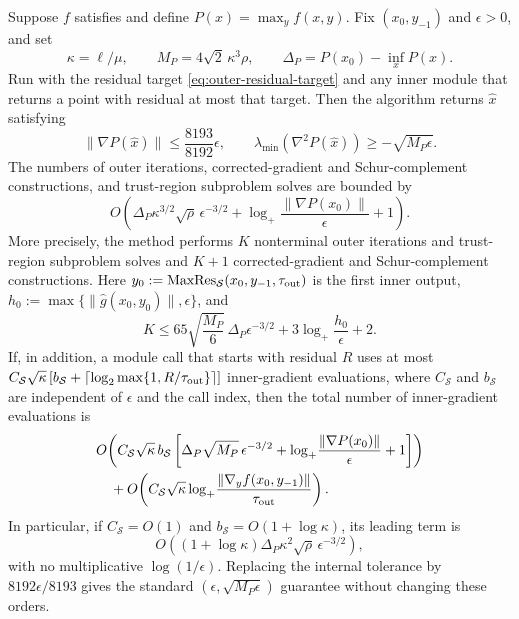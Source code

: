 \documentclass{article}
\begin{document}
\begin{theorem}
\label{thm:ncsc-complexity}
Suppose $f$ satisfies  and define
$P(x)=\max_y f(x,y)$.  Fix
$(x_0,y_{-1})$ and $\epsilon>0$, and set
\[
 \kappa=\ell/\mu,
 \qquad M_P=4\sqrt2\,\kappa^3\rho,
 \qquad \Delta_P=P(x_0)-\inf_xP(x).
\]
Run  with the residual target
\eqref{eq:outer-residual-target} and any inner module that returns a
point with residual at most that target.  Then the algorithm returns
$\widehat x$ satisfying
\begin{equation}\label{eq:ncsc-return}
 \|\nabla P(\widehat x)\|\le\frac{8193}{8192}\epsilon,
 \qquad
 \lambda_{\min}(\nabla^2P(\widehat x))
 \ge-\sqrt{M_P\epsilon}.
\end{equation}
The numbers of outer iterations, corrected-gradient and
Schur-complement constructions, and trust-region subproblem solves are
bounded by
\begin{equation}\label{eq:ncsc-outer-complexity}
\boxed{
 O\!\left(
  \Delta_P\kappa^{3/2}\sqrt\rho\,\epsilon^{-3/2}
  +\log_+\!\frac{\|\nabla P(x_0)\|}{\epsilon}+1
 \right).
}
\end{equation}
More precisely, the method performs $K$ nonterminal outer iterations
and trust-region subproblem solves and $K+1$ corrected-gradient and
Schur-complement constructions.  Here
$y_0:=\operatorname{MaxRes}_{\mathcal S}
(x_0,y_{-1},\tau_{\rm out})$ is the first inner output,
$h_0:=\max\{\|\widehat g(x_0,y_0)\|,\epsilon\}$, and
\begin{equation}\label{eq:ncsc-outer-explicit}
 K\le65\sqrt{\frac{M_P}{6}}\,\Delta_P\epsilon^{-3/2}
      +3\log_+\!\frac{h_0}{\epsilon}+2.
\end{equation}
If, in addition, a module call that starts with residual $R$ uses at
most
$C_{\mathcal S}\sqrt\kappa\,[b_{\mathcal S}+
\lceil\log_2\max\{1,R/\tau_{\rm out}\}\rceil]$
inner-gradient evaluations, where $C_{\mathcal S}$ and
$b_{\mathcal S}$ are independent of $\epsilon$ and the call index,
then the total number of inner-gradient evaluations is
\begin{align}
&O\!\left(
 C_{\mathcal S}\sqrt\kappa\,b_{\mathcal S}
 \left[
  \Delta_P\sqrt{M_P}\,\epsilon^{-3/2}
  +\log_+\!\frac{\|\nabla P(x_0)\|}{\epsilon}+1
 \right]
 \right)\notag\\
&\quad+O\!\left(
 C_{\mathcal S}\sqrt\kappa
 \log_+\!\frac{
 \|\nabla_yf(x_0,y_{-1})\|}{\tau_{\rm out}}
 \right).
\label{eq:ncsc-gradient-complexity}
\end{align}
In particular, if
$C_{\mathcal S}=O(1)$ and
$b_{\mathcal S}=O(1+\log\kappa)$, its leading term is
\begin{equation}\label{eq:ncsc-gradient-leading}
 O\!\left(
  (1+\log\kappa)\Delta_P\kappa^2\sqrt\rho\,
  \epsilon^{-3/2}
 \right),
\end{equation}
with no multiplicative $\log(1/\epsilon)$.
Replacing the internal tolerance by $8192\epsilon/8193$ gives the
standard $(\epsilon,\sqrt{M_P\epsilon})$ guarantee without changing
these orders.
\end{theorem}
\end{document}
